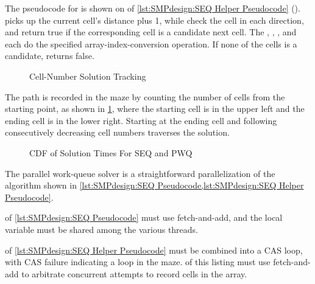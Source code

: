 \begin{fcvref}
The pseudocode for  is shown on
of \cref{lst:SMPdesign:SEQ Helper Pseudocode}
().
 picks up the current cell's distance plus 1,
while 
check the cell in each direction, and
return true if the corresponding cell is a candidate next cell.
The , , , and 
each do the specified array-index-conversion operation.
If none of the cells is a candidate,  returns false.
\end{fcvref}

\begin{figure}
\centering
{}
\caption{Cell-Number Solution Tracking}
\label{fig:SMPdesign:Cell-Number Solution Tracking}
\end{figure}

The path is recorded in the maze by counting the number of cells from
the starting point, as shown in
\cref{fig:SMPdesign:Cell-Number Solution Tracking},
where the starting cell is in the upper left and the ending cell is
in the lower right.
Starting at the ending cell and following
consecutively decreasing cell numbers traverses the solution.

\begin{figure}
\centering
{}
\caption{CDF of Solution Times For SEQ and PWQ}
\label{fig:SMPdesign:CDF of Solution Times For SEQ and PWQ}
\end{figure}

The parallel work-queue solver is a straightforward parallelization
of the algorithm shown in
\cref{lst:SMPdesign:SEQ Pseudocode,lst:SMPdesign:SEQ Helper Pseudocode}.
\begin{fcvref}
 of \cref{lst:SMPdesign:SEQ Pseudocode} must use fetch-and-add,
and the local variable  must be shared among the various threads.
\end{fcvref}
\begin{fcvref}
 of
\cref{lst:SMPdesign:SEQ Helper Pseudocode} must be
combined into a CAS loop, with CAS failure indicating a loop in the
maze.
 of this listing must use
fetch-and-add to arbitrate concurrent
attempts to record cells in the  array.
\end{fcvref}

